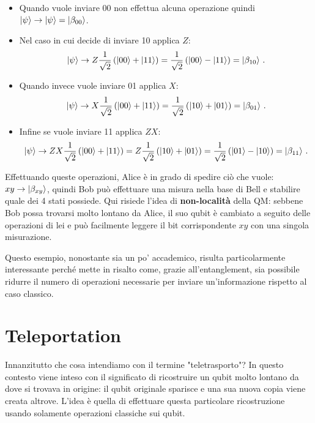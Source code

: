 \begin{itemize}
    \item Quando vuole inviare 00 non effettua alcuna operazione quindi $\ket{\psi} \rightarrow \ket{\psi} = \ket{\beta_{00}}$. 
    
    \item Nel caso in cui decide di inviare 10 applica $Z$:
    \begin{equation*}
        \ket{\psi} \rightarrow Z \frac{1}{\sqrt{2}} \left( \ket{00} + \ket{11} \right) = \frac{1}{\sqrt{2}} \left( \ket{00} - \ket{11} \right) = \ket{\beta_{10}} \, .
    \end{equation*}
    
    \item Quando invece vuole inviare 01 applica $X$:
    \begin{equation*}
        \ket{\psi} \rightarrow X \frac{1}{\sqrt{2}} \left( \ket{00} + \ket{11} \right) = \frac{1}{\sqrt{2}} \left( \ket{10} + \ket{01} \right) = \ket{\beta_{01}} \, .
    \end{equation*}
    
    \item Infine se vuole inviare 11 applica $ZX$:
    \begin{equation*}
        \ket{\psi} \rightarrow ZX \frac{1}{\sqrt{2}} \left( \ket{00} + \ket{11} \right) = Z \frac{1}{\sqrt{2}} \left( \ket{10} + \ket{01} \right) = \frac{1}{\sqrt{2}} \left( \ket{01} - \ket{10} \right) = \ket{\beta_{11}} \, .
    \end{equation*}
\end{itemize}

\noindent Effettuando queste operazioni, Alice è in grado di spedire ciò che vuole: $xy \rightarrow \ket{\beta_{xy}}$, quindi Bob può effettuare una misura nella base di Bell e stabilire quale dei 4 stati possiede. Qui risiede l'idea di \textbf{non-località} della QM: sebbene Bob possa trovarsi molto lontano da Alice, il suo qubit è cambiato a seguito delle operazioni di lei e può facilmente leggere il bit corrispondente $xy$ con una singola misurazione. 

\noindent Questo esempio, nonostante sia un po' accademico, risulta particolarmente interessante perché mette in risalto come, grazie all'entanglement, sia possibile ridurre il numero di operazioni necessarie per inviare un'informazione rispetto al caso classico. 

\section{Teleportation}
Innanzitutto che cosa intendiamo con il termine "teletrasporto"? In questo contesto viene inteso con il significato di ricostruire un qubit molto lontano da dove si trovava in origine: il qubit originale sparisce e una sua nuova copia viene creata altrove. L'idea è quella di effettuare questa particolare ricostruzione usando solamente operazioni classiche sui qubit.

